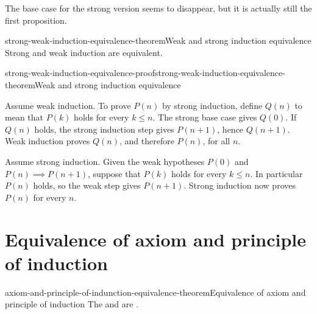 \documentclass[preview]{standalone}
\begin{document}
\begin{plainhtml}
    The base case for the strong version seems to disappear,
    but it is actually still the first proposition.
\end{plainhtml}

\begin{snippettheorem}{strong-weak-induction-equivalence-theorem}{Weak and strong induction equivalence}
    Strong and weak induction are equivalent.
\end{snippettheorem}

\begin{snippetproof}{strong-weak-induction-equivalence-proof}{strong-weak-induction-equivalence-theorem}{Weak and strong induction equivalence}
    \begin{iffproof}
        \item Assume weak induction. To prove \(P(n)\) by strong induction,
            define \(Q(n)\) to mean that \(P(k)\) holds for every \(k\leq n\).
            The strong base case gives \(Q(0)\). If \(Q(n)\) holds, the
            strong induction step gives \(P(n+1)\), hence \(Q(n+1)\).
            Weak induction proves \(Q(n)\), and therefore \(P(n)\), for all \(n\).
        \item Assume strong induction. Given the weak hypotheses
            \(P(0)\) and \(P(n)\implies P(n+1)\), suppose that \(P(k)\)
            holds for every \(k\leq n\). In particular \(P(n)\) holds, so
            the weak step gives \(P(n+1)\). Strong induction now proves
            \(P(n)\) for every \(n\).
    \end{iffproof}
\end{snippetproof}

\section{Equivalence of axiom and principle of induction}

\begin{snippettheorem}{axiom-and-principle-of-indunction-equivalence-theorem}{Equivalence of axiom and principle of induction}
    The \axiomofinduction and \principleofinduction are \ifandonlyif[equivalent].
\end{snippettheorem}
\end{document}
